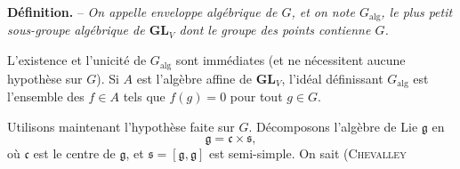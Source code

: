 \textbf{Définition.} -- \textit{On appelle enveloppe algébrique de $G$, et on note $G_{\mathrm{alg}}$, le plus petit sous-groupe algébrique de $\mathbf{GL}_V$ dont le groupe des points contienne $G$.}

L'existence et l'unicité de $G_{\mathrm{alg}}$ sont immédiates (et ne nécessitent aucune hypothèse sur $G$). Si $A$ est l'algèbre affine de $\mathbf{GL}_V$, l'idéal définissant $G_{\mathrm{alg}}$ est l'ensemble des $f\in A$ tels que $f(g)=0$ pour tout $g\in G$.

Utilisons maintenant l'hypothèse faite sur $G$. Décomposons l'algèbre de Lie $\mathfrak g$ en
\[
\mathfrak g=\mathfrak c\times\mathfrak s,
\]
où $\mathfrak c$ est le centre de $\mathfrak g$, et $\mathfrak s=[\mathfrak g,\mathfrak g]$ est semi-simple. On sait (\textsc{Chevalley}
